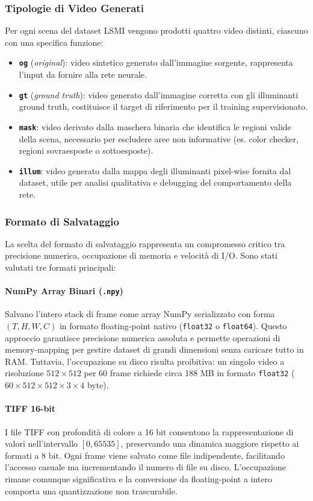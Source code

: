 \subsubsection{Tipologie di Video Generati}
Per ogni scena del dataset LSMI vengono prodotti quattro video distinti, ciascuno con una specifica funzione:
\begin{itemize}
    \item \textbf{\texttt{og}} (\emph{original}): video sintetico generato dall'immagine sorgente, rappresenta l'input da fornire alla rete neurale.
    \item \textbf{\texttt{gt}} (\emph{ground truth}): video generato dall'immagine corretta con gli illuminanti ground truth, costituisce il target di riferimento per il training supervisionato.
    \item \textbf{\texttt{mask}}: video derivato dalla maschera binaria che identifica le regioni valide della scena, necessario per escludere aree non informative (es. color checker, regioni sovraesposte o sottoesposte).
    \item \textbf{\texttt{illum}}: video generato dalla mappa degli illuminanti pixel-wise fornita dal dataset, utile per analisi qualitativa e debugging del comportamento della rete.
\end{itemize}

\subsubsection{Formato di Salvataggio}
La scelta del formato di salvataggio rappresenta un compromesso critico tra precisione numerica, occupazione di memoria e velocità di I/O. Sono stati valutati tre formati principali:

\paragraph{NumPy Array Binari (\texttt{.npy})}
Salvano l'intero stack di frame come array NumPy serializzato con forma $(T, H, W, C)$ in formato floating-point nativo (\texttt{float32} o \texttt{float64}). Questo approccio garantisce precisione numerica assoluta e permette operazioni di memory-mapping per gestire dataset di grandi dimensioni senza caricare tutto in RAM. Tuttavia, l'occupazione su disco risulta proibitiva: un singolo video a risoluzione $512 \times 512$ per 60 frame richiede circa 188 MB in formato \texttt{float32} ($60 \times 512 \times 512 \times 3 \times 4$ byte).

\paragraph{TIFF 16-bit}
I file TIFF con profondità di colore a 16 bit consentono la rappresentazione di valori nell'intervallo $[0, 65535]$, preservando una dinamica maggiore rispetto ai formati a 8 bit. Ogni frame viene salvato come file indipendente, facilitando l'accesso casuale ma incrementando il numero di file su disco. L'occupazione rimane comunque significativa e la conversione da floating-point a intero comporta una quantizzazione non trascurabile.

